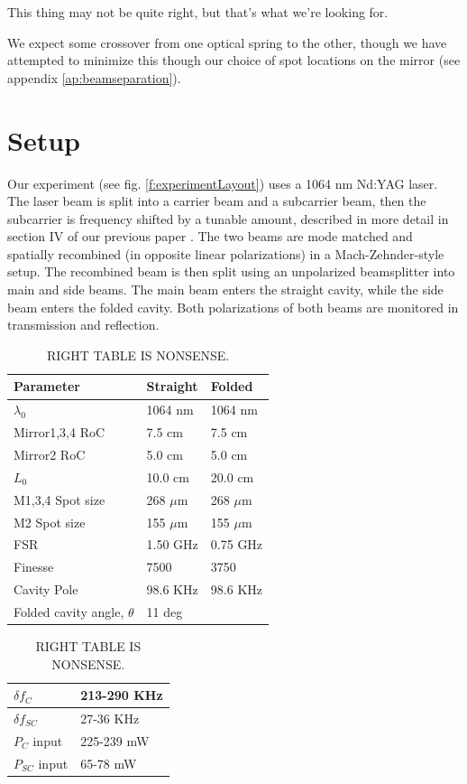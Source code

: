 This thing may not be quite right, but that's what we're looking for.

We expect some crossover from one optical spring to the other, though we have attempted to minimize this though our choice of spot locations on the mirror (see appendix \ref{ap:beamseparation}).


\section{Setup}
Our experiment (see fig. \ref{f:experimentLayout}) uses a 1064 nm Nd:YAG laser. The laser beam is split into a carrier beam and a subcarrier beam, then the subcarrier is frequency shifted by a tunable amount, described in more detail in section IV of our previous paper \cite{Kelley15}. The two beams are mode matched and spatially recombined (in opposite linear polarizations) in a Mach-Zehnder-style setup. The recombined beam is then split using an unpolarized beamsplitter into main and side beams. The main beam enters the straight cavity, while the side beam enters the folded cavity. Both polarizations of both beams are monitored in transmission and reflection.



\begin{table}[h]
\begin{tabular}{|l|l|l|}
\hline
Parameter & Straight & Folded \\ \hline
$\lambda_0$ & 1064 nm & 1064 nm \\ \hline
Mirror1,3,4 RoC & 7.5 cm & 7.5 cm \\ \hline
Mirror2 RoC & 5.0 cm & 5.0 cm \\ \hline
$L_0$ & 10.0 cm & 20.0 cm \\ \hline
M1,3,4 Spot size  & 268 $\mu$m & 268 $\mu$m\\ \hline
M2 Spot size  & 155 $\mu$m & 155 $\mu$m\\ \hline
FSR      & 1.50 GHz & 0.75 GHz \\ \hline
Finesse & 7500 & 3750 \\ \hline
Cavity Pole & 98.6 KHz & 98.6 KHz\\ \hline
Folded cavity angle, $\theta$ & 11 deg\\ \hline
\end{tabular}
%
\begin{tabular}{|l|l|}
\hline
$\delta f_{C}$ & 213-290 KHz \\ \hline
$\delta f_{SC}$ & 27-36 KHz \\ \hline
$P_{C}$ input& 225-239 mW \\ \hline
$P_{SC}$ input & 65-78 mW \\ \hline
\end{tabular}
\caption[4 km angular parameters]{RIGHT TABLE IS NONSENSE.}
\label{tab:longAngParams}
\end{table}


